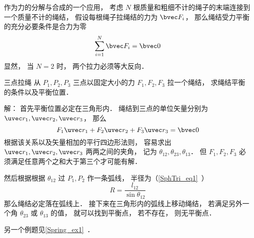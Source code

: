 

作为力的分解与合成的一个应用， 考虑 $N$ 根质量和粗细不计的绳子的末端连接到一个质量不计的绳结， 假设每根绳子拉绳结的力为 $\bvec F_i$， 那么绳结受力平衡的充分必要条件是合力为零
\begin{equation}
\sum_{i=1}^N \bvec F_i = \bvec 0
\end{equation}
显然， 当 $N = 2$ 时， 两个拉力必须等大反向．

\begin{example}{三点拉绳}
从 $P_1,P_2,P_3$ 三点以固定大小的力 $F_1, F_2, F_3$ 拉一个绳结， 求绳结平衡的条件以及平衡位置．

解： 首先平衡位置必定在三角形内． 绳结到三点的单位矢量分别为 $\uvec r_1, \uvec r_2, \uvec r_3$， 那么
\begin{equation}
F_1 \uvec r_1 + F_2 \uvec r_2 + F_3 \uvec r_3 = \bvec 0
\end{equation}
根据该关系以及矢量相加的平行四边形法则， 容易求出 $\uvec r_1, \uvec r_2, \uvec r_3$ 两两之间的夹角， 记为 $\theta_{12}, \theta_{23}, \theta_{13}$． 但 $F_1, F_2, F_3$ 必须满足任意两个之和大于第三个才可能有解．

然后根据根据 $\theta_{12}$ 过 $P_1, P_2$ 作一条弧线， 半径为（\autoref{SphTri_eq1}~）
\begin{equation}
R = \frac{l_{12}}{\sin\theta_{12}}
\end{equation}
那么绳结必定落在弧线上． 接下来在三角形内的弧线上移动绳结， 若满足另外一个角 $\theta_{23}$ 或 $\theta_{13}$ 的值， 就可以找到平衡点， 若不存在， 则无平衡点．
\end{example}

另一个例题见\autoref{Spring_ex1}~．
